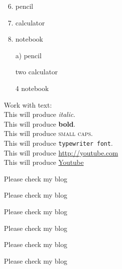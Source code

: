 \documentclass[11pt,  a4paper]{article}
\begin{document}
\vspace{0.5cm}

\begin{enumerate} \setcounter{enumi}{5}
\item pencil
\item calculator
\item notebook
\end{enumerate}

\vspace{0.5cm}

\begin{enumerate} \setcounter{enumi}{5}
\item[a)] pencil
\item[two] calculator
\item[4] notebook
\end{enumerate}

Work with text:\\
This will produce \textit{italic}.\\
This will produce \textbf{bold}.\\
This will produce \textsc{small caps}.\\
This will produce \texttt{typewriter font}.\\  %
This will produce \url{http://youtube.com}\\
This will produce \href{http://youtube.com}{Youtube}
\vspace{1cm}

Please check my blog\\

\begin{large}
Please check my blog\\
\end{large}

\begin{Large}
Please check my blog\\
\end{Large}

\begin{LARGE}
Please check my blog\\
\end{LARGE}

\begin{huge}
Please check my blog\\
\end{huge}

\begin{Huge}
Please check my blog\\
\end{Huge}
\end{document}

